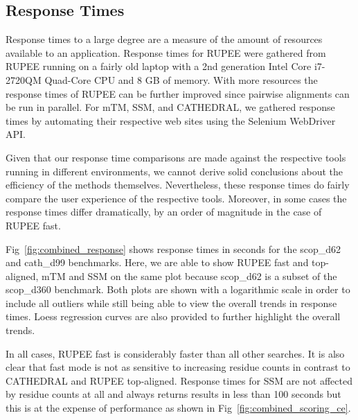 \documentclass[10pt,letterpaper]{article}
\renewcommand{\figurename}{Fig}
\begin{document}
\subsection*{Response Times}

Response times to a large degree are a measure of the amount of resources available to an application. 
Response times for RUPEE were gathered from RUPEE running on a fairly old laptop with a 2nd generation Intel\textregistered{} Core\texttrademark{} i7-2720QM Quad-Core CPU and 8 GB of memory. 
With more resources the response times of RUPEE can be further improved since pairwise alignments can be run in parallel. 
For mTM, SSM, and CATHEDRAL, we gathered response times by automating their respective web sites using the Selenium WebDriver API. 

Given that our response time comparisons are made against the respective tools running in different environments, we cannot derive solid conclusions about the efficiency of the methods themselves. 
Nevertheless, these response times do fairly compare the user experience of the respective tools. 
Moreover, in some cases the response times differ dramatically, by an order of magnitude in the case of RUPEE fast. 

\figurename~\ref{fig:combined_response} shows response times in seconds for the scop\_d62 and cath\_d99 benchmarks. 
Here, we are able to show RUPEE fast and top-aligned, mTM and SSM on the same plot because scop\_d62 is a subset of the scop\_d360 benchmark. 
Both plots are shown with a logarithmic scale in order to include all outliers while still being able to view the overall trends in response times. 
Loess regression curves are also provided to further highlight the overall trends. 

\begin{figure*}[h!]
\caption{Response times for RUPEE fast and RUPEE top-aligned. The response times for RUPEE top-aligned are dominated by pairwise structure alignments and do not depend on the sort order.}
\label{fig:combined_response}
\end{figure*}

In all cases, RUPEE fast is considerably faster than all other searches. 
It is also clear that fast mode is not as sensitive to increasing residue counts in contrast to CATHEDRAL and RUPEE top-aligned.
Response times for SSM are not affected by residue counts at all and always returns results in less than 100 seconds but this is at the expense of performance as shown in \figurename~\ref{fig:combined_scoring_ce}.
\end{document}

